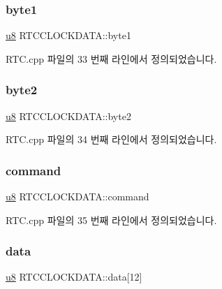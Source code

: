 \subsubsection{\texorpdfstring{byte1}{byte1}}
{\footnotesize\ttfamily \mbox{\hyperlink{_system_8h_aed742c436da53c1080638ce6ef7d13de}{u8}} R\+T\+C\+C\+L\+O\+C\+K\+D\+A\+T\+A\+::byte1}



R\+T\+C.\+cpp 파일의 33 번째 라인에서 정의되었습니다.

\mbox{\label{struct_r_t_c_c_l_o_c_k_d_a_t_a_a35e3e12280a58eeac5fd27e586c9b57a}} 
\subsubsection{\texorpdfstring{byte2}{byte2}}
{\footnotesize\ttfamily \mbox{\hyperlink{_system_8h_aed742c436da53c1080638ce6ef7d13de}{u8}} R\+T\+C\+C\+L\+O\+C\+K\+D\+A\+T\+A\+::byte2}



R\+T\+C.\+cpp 파일의 34 번째 라인에서 정의되었습니다.

\mbox{\label{struct_r_t_c_c_l_o_c_k_d_a_t_a_a911611e39e00cb0cc98cad454768f888}} 
\subsubsection{\texorpdfstring{command}{command}}
{\footnotesize\ttfamily \mbox{\hyperlink{_system_8h_aed742c436da53c1080638ce6ef7d13de}{u8}} R\+T\+C\+C\+L\+O\+C\+K\+D\+A\+T\+A\+::command}



R\+T\+C.\+cpp 파일의 35 번째 라인에서 정의되었습니다.

\mbox{\label{struct_r_t_c_c_l_o_c_k_d_a_t_a_a0ba8929e9478b7a19f1d852f1b059ffd}} 
\subsubsection{\texorpdfstring{data}{data}}
{\footnotesize\ttfamily \mbox{\hyperlink{_system_8h_aed742c436da53c1080638ce6ef7d13de}{u8}} R\+T\+C\+C\+L\+O\+C\+K\+D\+A\+T\+A\+::data\mbox{[}12\mbox{]}}



